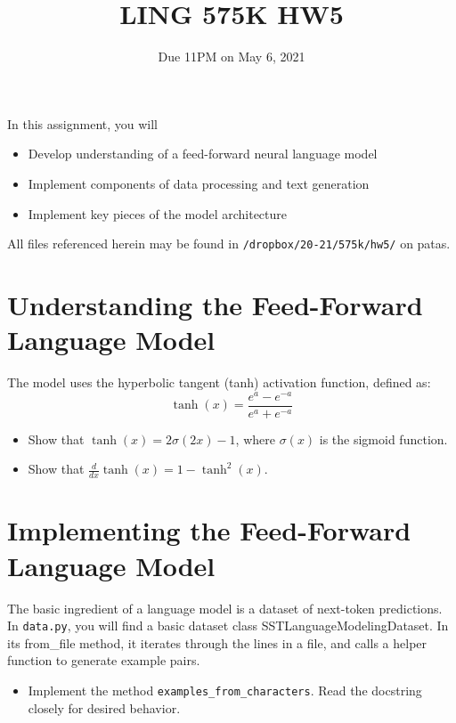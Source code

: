 \documentclass[11pt]{article}
\begin{document}
\title{LING 575K HW5}
\date{\vspace{-0.2in}Due 11PM on May 6, 2021}
\maketitle


\noindent In this assignment, you will 
\begin{itemize}
  \item Develop understanding of a feed-forward neural language model
  \item Implement components of data processing and text generation
  \item Implement key pieces of the model architecture
\end{itemize}
All files referenced herein may be found in \texttt{/dropbox/20-21/575k/hw5/} on patas.


\section{Understanding the Feed-Forward Language Model}



\vspace{2em}
 The model uses the hyperbolic tangent (tanh) activation function, defined as:
\[ \tanh(x) = \frac{e^a - e^{-a}}{e^a + e^{-a}} \]
\begin{itemize}
  \item Show that $\tanh(x) = 2\sigma(2x) - 1$, where $\sigma(x)$ is the sigmoid function.
  \item Show that $\frac{d}{dx}\tanh(x) = 1 - \tanh^2(x)$.
\end{itemize}


\section{Implementing the Feed-Forward Language Model}

 The basic ingredient of a language model is a dataset of next-token predictions. In \texttt{data.py}, you will find a basic dataset class SSTLanguageModelingDataset.  In its from\_file method, it iterates through the lines in a file, and calls a helper function to generate example pairs.
\begin{itemize}
  \item Implement the method \texttt{examples\_from\_characters}.  Read the docstring closely for desired behavior.
\end{itemize}
\end{document}
